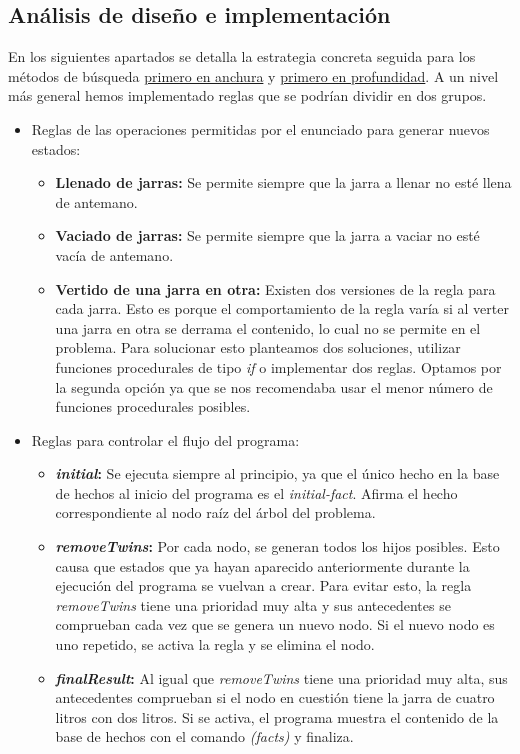 \documentclass[11pt,a4paper,final]{article}
\begin{document}
\subsection{Análisis de diseño e implementación}
En los siguientes apartados se detalla la estrategia concreta seguida para los métodos de búsqueda \hyperref[anchura]{primero en anchura} y \hyperref[profundidad]{primero en profundidad}. A un nivel más general hemos implementado reglas que se podrían dividir en dos grupos.
\begin{itemize}
	\item Reglas de las operaciones permitidas por el enunciado para generar nuevos estados:
	\begin{itemize}
		\item \textbf{Llenado de jarras:} Se permite siempre que la jarra a llenar no esté llena de antemano.
		\item \textbf{Vaciado de jarras:} Se permite siempre que la jarra a vaciar no esté vacía de antemano.
		\item \textbf{Vertido de una jarra en otra:} Existen dos versiones de la regla para cada jarra. Esto es porque  el comportamiento de la regla varía si al verter una jarra en otra se derrama el contenido, lo cual no se permite en el problema. Para solucionar esto planteamos dos soluciones, utilizar funciones procedurales de tipo \emph{if} o implementar dos reglas. Optamos por la segunda opción ya que se nos recomendaba usar el menor número de funciones procedurales posibles.
	\end{itemize}
	\item Reglas para controlar el flujo del programa:
	\begin{itemize}
		\item \textbf{\emph{initial}:} Se ejecuta siempre al principio, ya que el único hecho en la base de hechos al inicio del programa es el \emph{initial-fact}. Afirma el hecho correspondiente al nodo raíz del árbol del problema.
		\item \textbf{\emph{removeTwins}:} Por cada nodo, se generan todos los hijos posibles. Esto causa que estados que ya hayan aparecido anteriormente durante la ejecución del programa se vuelvan a crear. Para evitar esto, la regla \emph{removeTwins} tiene una prioridad muy alta y sus antecedentes se comprueban cada vez que se genera un nuevo nodo. Si el nuevo nodo es uno repetido, se activa la regla y se elimina el nodo.
		\item \textbf{\emph{finalResult}:} Al igual que \emph{removeTwins} tiene una prioridad muy alta, sus antecedentes comprueban si el nodo en cuestión tiene la jarra de cuatro litros con dos litros. Si se activa, el programa muestra el contenido de la base de hechos con el comando \emph{(facts)} y finaliza.
	\end{itemize}
\end{itemize}
\end{document}
